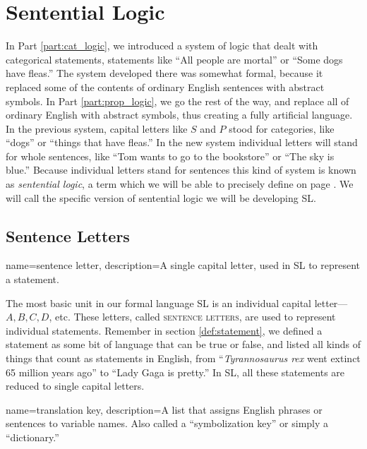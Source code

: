 \chapter{Sentential Logic}
\label{ch:SL}


In Part \ref{part:cat_logic}, we introduced a system of logic that dealt with categorical statements, statements like ``All people are mortal'' or ``Some dogs have  fleas.'' The system developed there was somewhat formal, because it replaced some of the contents of ordinary English sentences with abstract symbols. In Part \ref{part:prop_logic}, we go the rest of the way, and replace all of ordinary English with abstract symbols, thus creating a fully artificial language. In the previous system, capital letters like $S$ and $P$ stood for categories, like ``dogs'' or ``things that have fleas.'' In the new system individual letters will stand for whole sentences, like ``Tom wants to go to the bookstore'' or ``The sky is blue.'' Because individual letters stand for sentences this kind of system is known as \textit{sentential logic}, a term which we will be able to precisely define on page \pageref{def:sentential_logic}. We will call the specific version of sentential logic we will be developing SL.

\section{Sentence Letters}


{
name=sentence letter,
description={A single capital letter, used in SL to represent a statement.}
}

The most basic unit in our formal language SL is an individual capital letter---$A, B, C, D$, etc. These letters, called \textsc{\glspl{sentence letter}}, \label{def:sentence_letter} are used to represent individual statements. Remember in section \ref{def:statement}, we defined a statement as some bit of language that can be true or false, and listed all kinds of things that count as statements in English, from ``\emph{Tyrannosaurus rex} went extinct 65 million years ago'' to ``Lady Gaga is pretty.'' In SL, all these statements are reduced to single capital letters.

{
name=translation key,
description={A list that assigns English phrases or sentences to variable names. Also called a ``symbolization key''  or simply a ``dictionary.''}
}

